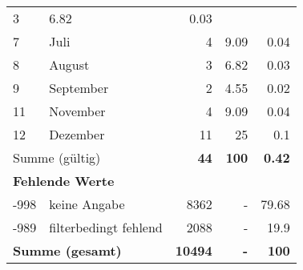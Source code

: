 \begin{longtable}{lXrrr}
       \num{3} &
       \num[round-mode=places,round-precision=2]{6,82} &
         \num[round-mode=places,round-precision=2]{0,03} \\

     7 &
     \multicolumn{1}{X}{ Juli   } &


       \num{4} &
       \num[round-mode=places,round-precision=2]{9,09} &
         \num[round-mode=places,round-precision=2]{0,04} \\

     8 &
     \multicolumn{1}{X}{ August   } &


       \num{3} &
       \num[round-mode=places,round-precision=2]{6,82} &
         \num[round-mode=places,round-precision=2]{0,03} \\

     9 &
     \multicolumn{1}{X}{ September   } &


       \num{2} &
       \num[round-mode=places,round-precision=2]{4,55} &
         \num[round-mode=places,round-precision=2]{0,02} \\

     11 &
     \multicolumn{1}{X}{ November   } &


       \num{4} &
       \num[round-mode=places,round-precision=2]{9,09} &
         \num[round-mode=places,round-precision=2]{0,04} \\

     12 &
     \multicolumn{1}{X}{ Dezember   } &


       \num{11} &
       \num[round-mode=places,round-precision=2]{25} &
         \num[round-mode=places,round-precision=2]{0,1} \\
     \midrule
     \multicolumn{2}{l}{Summe (gültig)} &
       \textbf{\num{44}} &
     \textbf{100} &
       \textbf{\num[round-mode=places,round-precision=2]{0,42}} \\
     \multicolumn{5}{l}{\textbf{Fehlende Werte}}\\
       -998 &
       keine Angabe &
         \num{8362} &
        - &
         \num[round-mode=places,round-precision=2]{79,68} \\
       -989 &
       filterbedingt fehlend &
         \num{2088} &
        - &
         \num[round-mode=places,round-precision=2]{19,9} \\
     \midrule
     \multicolumn{2}{l}{\textbf{Summe (gesamt)}} &
          \textbf{\num{10494}} &
        \textbf{-} &
        \textbf{100} \\
     \bottomrule
     \end{longtable}
     
